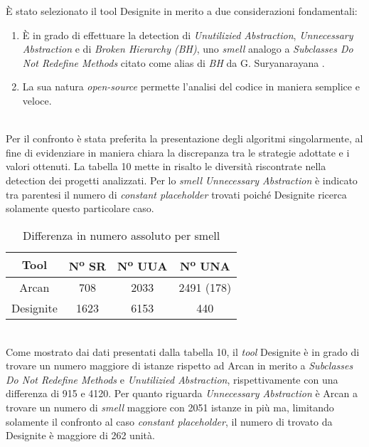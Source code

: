 È stato selezionato il tool Designite in merito a due considerazioni fondamentali:
\begin{enumerate}
    \item È in grado di effettuare la detection di \textit{Unutilizied Abstraction}, \textit{Unnecessary Abstraction} e di \textit{Broken Hierarchy (BH)}, uno \textit{smell} analogo a \textit{Subclasses Do Not Redefine Methods} citato come alias di \textit{BH} da G. Suryanarayana \cite{SURYANARAYANA201521}.
    
    \item La sua natura \textit{open-source} permette l'analisi del codice in maniera semplice e veloce.
\end{enumerate}\\
Per il confronto è stata preferita la presentazione degli algoritmi singolarmente, al fine di evidenziare in maniera chiara la discrepanza tra le strategie adottate e i valori ottenuti. La tabella 10 mette in risalto le diversità riscontrate nella detection dei progetti analizzati. Per lo \textit{smell} \textit{Unnecessary Abstraction} è indicato tra parentesi il numero di \textit{constant placeholder} trovati poiché Designite ricerca solamente questo particolare caso. 
%
\begin{table}[h]
    \centering
    \begin{tabular}{|c|c|c|c|}
        \hline
        \textbf{Tool} & \textbf{N\textsuperscript{o} SR} & \textbf{N\textsuperscript{o} UUA} & \textbf{N\textsuperscript{o} UNA}  \\
        \hline
        Arcan & 708 & 2033 & 2491 (178) \\
        Designite & 1623 & 6153 & 440 \\
        \hline
    \end{tabular}
    \caption{Differenza in numero assoluto per smell}
    \label{tab:caption}
\end{table}
\\
Come mostrato dai dati presentati dalla tabella 10, il \textit{tool} Designite è in grado di trovare un numero maggiore di istanze rispetto ad Arcan in merito a \textit{Subclasses Do Not Redefine Methods} e \textit{Unutilizied Abstraction}, rispettivamente con una differenza di 915 e 4120. Per quanto riguarda \textit{Unnecessary Abstraction} è Arcan a trovare un numero di \textit{smell} maggiore con 2051 istanze in più ma, limitando solamente il confronto al caso \textit{constant placeholder}, il numero di trovato da Designite è maggiore di 262 unità.

